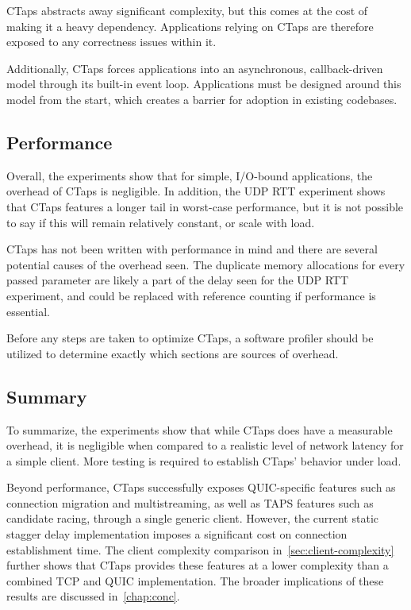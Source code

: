 CTaps abstracts away significant complexity, but this comes at the cost of making it a heavy
dependency. Applications relying on CTaps are therefore exposed to any correctness issues within it.

Additionally, CTaps forces applications into an asynchronous, callback-driven model
through its built-in event loop.
Applications must be designed around this model from the start,
which creates a barrier for adoption in existing codebases.

\subsection{Performance}\label{sec:disc-perf}
Overall, the experiments show that for simple, I/O-bound applications,
the overhead of CTaps is negligible.
In addition, the UDP RTT experiment
shows that CTaps features a longer tail in worst-case
performance, but it is not possible to say if this will remain
relatively constant, or scale with load.

CTaps has not been written with performance in mind and
there are several potential causes of the overhead seen.
The duplicate memory allocations for every passed parameter are likely a
part of the delay seen for the UDP RTT experiment, and
could be replaced with reference counting if performance is
essential.

Before any steps are taken to optimize CTaps, a
software profiler should be utilized to determine exactly which
sections are sources of overhead.

\subsection{Summary}
To summarize, the experiments show that while CTaps does have a measurable overhead,
it is negligible when compared to a realistic level of network latency for a simple client.
More testing is required to establish CTaps' behavior under load.

Beyond performance, CTaps successfully exposes QUIC-specific features such as connection migration and multistreaming,
as well as TAPS features such as candidate racing, through a single generic client.
However, the current static stagger delay implementation imposes a significant cost
on connection establishment time. The client complexity comparison in~\cref{sec:client-complexity}
further shows that CTaps provides these features at a lower complexity than a combined TCP and QUIC
implementation. The broader implications of these results are discussed in~\cref{chap:conc}.
